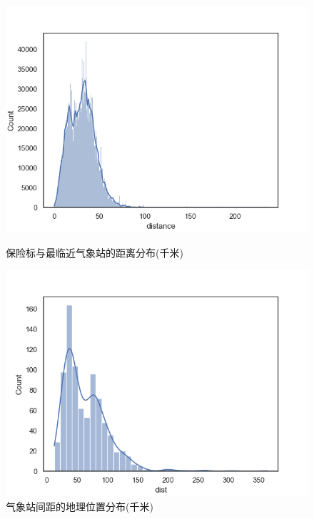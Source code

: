 \begin{figure}[H]
    \begin{minipage}{0.48\linewidth}
        \centering
        \includegraphics[width=\textwidth]{lib/img/distance.png}
        \caption{保险标与最临近气象站的距离分布(千米)}
        \label{fig:distance}
    \end{minipage}
    \begin{minipage}{0.48\linewidth}
        \centering
        \includegraphics[width=\textwidth]{lib/img/locations_distance.png}
        \caption{气象站间距的地理位置分布(千米)}
        \label{fig:locations}
    \end{minipage}
\end{figure}

